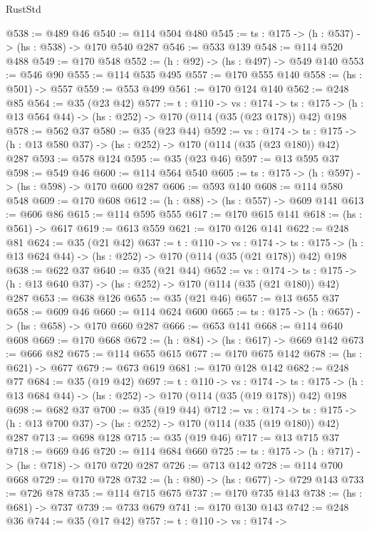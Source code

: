 \begin{lexlean}{RustStd}
\begin{coremodule}
@538 := @489 @46
@540 := @114 @504 @480
@545 := {ts : @175} -> (h : @537) -> (hs : @538) -> @170 @540 @287
@546 := @533 @139
@548 := @114 @520 @488
@549 := @170 @548
@552 := (h : @92) -> (hs : @497) -> @549 @140
@553 := @546 @90
@555 := @114 @535 @495
@557 := @170 @555 @140
@558 := (hs : @501) -> @557
@559 := @553 @499
@561 := @170 @124 @140
@562 := @248 @85
@564 := @35 (@23 @42)
@577 := {t : @110} ->
  {vs : @174} ->
  {ts : @175} -> (h : @13 @564 @44) -> (hs : @252) -> @170 (@114 (@35 (@23 @178)) @42) @198
@578 := @562 @37
@580 := @35 (@23 @44)
@592 := {vs : @174} ->
  {ts : @175} -> (h : @13 @580 @37) -> (hs : @252) -> @170 (@114 (@35 (@23 @180)) @42) @287
@593 := @578 @124
@595 := @35 (@23 @46)
@597 := @13 @595 @37
@598 := @549 @46
@600 := @114 @564 @540
@605 := {ts : @175} -> (h : @597) -> (hs : @598) -> @170 @600 @287
@606 := @593 @140
@608 := @114 @580 @548
@609 := @170 @608
@612 := (h : @88) -> (hs : @557) -> @609 @141
@613 := @606 @86
@615 := @114 @595 @555
@617 := @170 @615 @141
@618 := (hs : @561) -> @617
@619 := @613 @559
@621 := @170 @126 @141
@622 := @248 @81
@624 := @35 (@21 @42)
@637 := {t : @110} ->
  {vs : @174} ->
  {ts : @175} -> (h : @13 @624 @44) -> (hs : @252) -> @170 (@114 (@35 (@21 @178)) @42) @198
@638 := @622 @37
@640 := @35 (@21 @44)
@652 := {vs : @174} ->
  {ts : @175} -> (h : @13 @640 @37) -> (hs : @252) -> @170 (@114 (@35 (@21 @180)) @42) @287
@653 := @638 @126
@655 := @35 (@21 @46)
@657 := @13 @655 @37
@658 := @609 @46
@660 := @114 @624 @600
@665 := {ts : @175} -> (h : @657) -> (hs : @658) -> @170 @660 @287
@666 := @653 @141
@668 := @114 @640 @608
@669 := @170 @668
@672 := (h : @84) -> (hs : @617) -> @669 @142
@673 := @666 @82
@675 := @114 @655 @615
@677 := @170 @675 @142
@678 := (hs : @621) -> @677
@679 := @673 @619
@681 := @170 @128 @142
@682 := @248 @77
@684 := @35 (@19 @42)
@697 := {t : @110} ->
  {vs : @174} ->
  {ts : @175} -> (h : @13 @684 @44) -> (hs : @252) -> @170 (@114 (@35 (@19 @178)) @42) @198
@698 := @682 @37
@700 := @35 (@19 @44)
@712 := {vs : @174} ->
  {ts : @175} -> (h : @13 @700 @37) -> (hs : @252) -> @170 (@114 (@35 (@19 @180)) @42) @287
@713 := @698 @128
@715 := @35 (@19 @46)
@717 := @13 @715 @37
@718 := @669 @46
@720 := @114 @684 @660
@725 := {ts : @175} -> (h : @717) -> (hs : @718) -> @170 @720 @287
@726 := @713 @142
@728 := @114 @700 @668
@729 := @170 @728
@732 := (h : @80) -> (hs : @677) -> @729 @143
@733 := @726 @78
@735 := @114 @715 @675
@737 := @170 @735 @143
@738 := (hs : @681) -> @737
@739 := @733 @679
@741 := @170 @130 @143
@742 := @248 @36
@744 := @35 (@17 @42)
@757 := {t : @110} ->
  {vs : @174} ->

\end{coremodule}
\end{lexlean}
